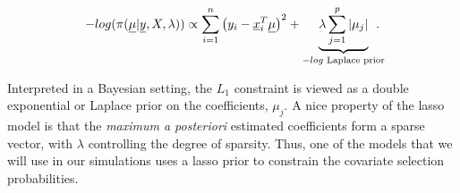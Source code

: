 		\begin{equation}\label{eqn:lasso_obj}
		-log(\pi(\vec{\mu} \vert \vec{y}, X, \lambda )) \propto \sum_{i=1}^n\left(y_i - \vec{x}_i^T\vec{\mu}\right)^2 + \underbrace{\lambda \sum_{j=1}^p \vert \mu_j \vert}_{\text{$-log$ Laplace prior}}\hspace{-0.3cm}.
		\end{equation}
		
\noindent Interpreted in a Bayesian setting, the $L_1$ constraint is viewed as a double exponential or Laplace prior on the coefficients, $\mu_j$. A nice property of the lasso model is that the \emph{maximum a posteriori} estimated coefficients form a sparse vector, with $\lambda$ controlling the degree of sparsity. Thus, one of the models that we will use in our simulations uses a lasso prior to constrain the covariate selection probabilities. 

